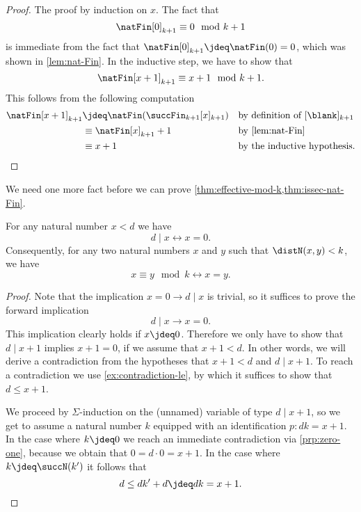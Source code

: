 \begin{proof}
  The proof by induction on $x$. The fact that
  \begin{equation*}
    \natFin[0]_{k+1}\equiv 0 \mod {k+1}
  \end{equation*}
  is immediate from the fact that $\natFin[0]_{k+1}\jdeq\natFin(0)=0$, which was shown in \cref{lem:nat-Fin}. In the inductive step, we have to show that
  \begin{equation*}
    \natFin[x+1]_{k+1}\equiv x+1\mod k+1.
  \end{equation*}
  This follows from the following computation
  \begin{align*}
    \natFin[x+1]_{k+1} & \jdeq \natFin(\succFin_{k+1}[x]_{k+1}) & & \text{by definition of }[\blank]_{k+1} \\
                       & \equiv \natFin[x]_{k+1}+1 & & \text{by \cref{lem:nat-Fin}} \\
                       & \equiv x+1 & & \text{by the inductive hypothesis.}\qedhere
  \end{align*}
\end{proof}

We need one more fact before we can prove \cref{thm:effective-mod-k,thm:issec-nat-Fin}.

\begin{prp}\label{cor:eq-congN}
  For any natural number $x<d$ we have
  \begin{equation*}
  d\mid x\leftrightarrow x=0.  
  \end{equation*}
  Consequently, for any two natural numbers $x$ and $y$ such that $\distN(x,y)<k$, we have
  \begin{equation*}
    x\equiv y\mod k\leftrightarrow x=y.
  \end{equation*}
\end{prp}

\begin{proof}
  Note that the implication $x=0\to d\mid x$ is trivial, so it suffices to prove the forward implication
  \begin{equation*}
    d\mid x \to x=0.
  \end{equation*}
  This implication clearly holds if $x\jdeq 0$. Therefore we only have to show that $d\mid x+1$ implies $x+1=0$, if we assume that $x+1<d$. In other words, we will derive a contradiction from the hypotheses that $x+1<d$ and $d\mid x+1$. To reach a contradiction we use \cref{ex:contradiction-le}, by which it suffices to show that $d\leq x+1$.
  
  We proceed by $\Sigma$-induction on the (unnamed) variable of type $d\mid x+1$, so we get to assume a natural number $k$ equipped with an identification $p:dk=x+1$. In the case where $k\jdeq 0$ we reach an immediate contradiction via \cref{prp:zero-one}, because we obtain that $0=d\cdot 0=x+1$. In the case where $k\jdeq\succN(k')$ it follows that
  \begin{equation*}
    d\leq dk'+ d\jdeq dk = x+1.\qedhere
  \end{equation*}
\end{proof}

